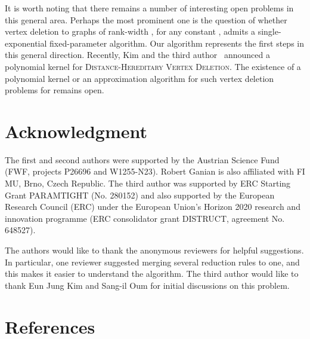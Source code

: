 \documentclass[11pt]{elsarticle}
\begin{document}
It is worth noting that there remains a number of interesting open problems in this general area. Perhaps the most prominent one is the question of whether vertex deletion to graphs of rank-width , for any constant , admits a single-exponential fixed-parameter algorithm. Our algorithm represents the first steps in this general direction. 
Recently, Kim and the third author~\cite{KimK2016} announced a polynomial kernel for \textsc{Distance-Hereditary Vertex Deletion}.
The existence of a polynomial kernel or an approximation algorithm for such vertex deletion problems for  remains open.

\section*{Acknowledgment}
The first and second authors were supported by the Austrian Science Fund (FWF, projects P26696 and W1255-N23). Robert Ganian is also affiliated with FI MU, Brno, Czech Republic. The third author was supported by ERC Starting Grant PARAMTIGHT (No. 280152) and also supported by the European Research Council (ERC) under the European Union's Horizon 2020 research and innovation programme (ERC consolidator grant DISTRUCT, agreement No. 648527). 

The authors would like to thank the anonymous reviewers for helpful suggestions. In particular, one reviewer suggested merging several reduction rules to one, and this makes it easier to understand the algorithm.
The third author would like to thank Eun Jung Kim and Sang-il Oum for initial discussions on this problem.

\section*{References}
\end{document}
